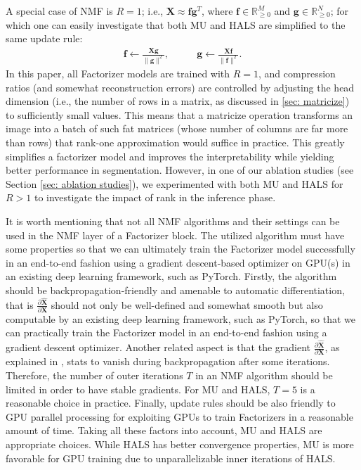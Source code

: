 \documentclass[a4,12pt]{article}
\begin{document}
	A special case of NMF is $ R = 1 $; i.e., $ \mathbf{X} \approx \mathbf{f} \mathbf{g}^T $, where $ \mathbf{f} \in \mathbb{R}_{\ge 0}^M $ and $ \mathbf{g} \in \mathbb{R}_{\ge 0}^N $; for which one can easily investigate that both MU and HALS are simplified to the same update rule:
	\begin{align}
		\label{eq: rank-one update formulas} 
		\mathbf{f} \gets \frac{\mathbf{X} \mathbf{g}}{\lVert \mathbf{g} \rVert^2}, \qquad &  \mathbf{g} \gets \frac{\mathbf{X} \mathbf{f}}{\lVert \mathbf{f} \rVert^2}.
	\end{align}
	In this paper, all Factorizer models are trained with $ R = 1 $, and compression ratios (and somewhat reconstruction errors) are controlled by adjusting the head dimension (i.e., the number of rows in a matrix, as discussed in \ref{sec: matricize}) to sufficiently small values. This means that a matricize operation transforms an image into a batch of such fat matrices (whose number of columns are far more than rows) that rank-one approximation would suffice in practice. This greatly simplifies a factorizer model and improves the interpretability while yielding better performance in segmentation. However, in one of our ablation studies (see Section \ref{sec: ablation studies}), we experimented with both MU and HALS for $ R > 1 $ to investigate the impact of rank in the inference phase.
	
	It is worth mentioning that not all NMF algorithms and their settings can be used in the NMF layer of a Factorizer block. The utilized algorithm must have some properties so that we can ultimately train the Factorizer model successfully in an end-to-end fashion using a gradient descent-based optimizer on GPU(s) in an existing deep learning framework, such as PyTorch. Firstly, the algorithm should be backpropagation-friendly and amenable to automatic differentiation, that is $ \frac{\partial \hat{\mathbf{X}}}{\partial \mathbf{X}} $ should not only be well-defined and somewhat smooth but also computable by an existing deep learning framework, such as PyTorch, so that we can practically train the Factorizer model in an end-to-end fashion using a gradient descent optimizer. Another related aspect is that the gradient $ \frac{\partial \hat{\mathbf{X}}}{\partial \mathbf{X}} $, as explained in \citep{geng2021attention}, stats to vanish during backpropagation after some iterations. Therefore, the number of outer iterations $ T $ in an NMF algorithm should be limited in order to have stable gradients. For MU and HALS, $ T = 5 $ is a reasonable choice in practice. Finally, update rules should be also friendly to GPU parallel processing for exploiting GPUs to train Factorizers in a reasonable amount of time. Taking all these factors into account, MU and HALS are appropriate choices. While HALS has better convergence properties, MU is more favorable for GPU training due to unparallelizable inner iterations of HALS.
	
\end{document}
